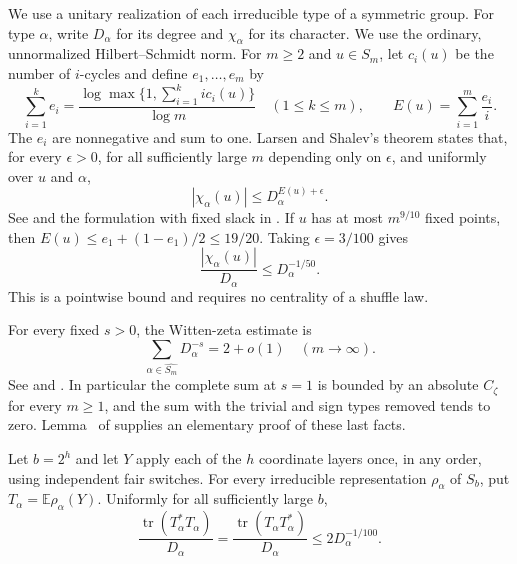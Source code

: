 We use a unitary realization of each irreducible type of a symmetric
group. For type $\alpha$, write $D_\alpha$ for its degree and
$\chi_\alpha$ for its character. We use the ordinary,
unnormalized Hilbert--Schmidt norm. For $m\ge2$ and $u\in S_m$, let
$c_i(u)$ be the number of $i$-cycles and define $e_1,\ldots,e_m$ by
\[
 \sum_{i=1}^k e_i=
 \frac{\log\max\{1,\sum_{i=1}^k i c_i(u)\}}{\log m}
 \quad(1\le k\le m),\qquad
 E(u)=\sum_{i=1}^m\frac{e_i}{i}.
\]
The $e_i$ are nonnegative and sum to one. Larsen and Shalev's theorem
states that, for every $\epsilon>0$, for all sufficiently large $m$
depending only on $\epsilon$, and uniformly over $u$ and $\alpha$,
\begin{equation}\label{frames:char:LS}
 |\chi_\alpha(u)|\le D_\alpha^{E(u)+\epsilon}.
\end{equation}
See \cite[Theorem~1.1]{larsen-shalev2008} and the formulation with
fixed slack in
\cite[Definition~2.1 and Theorem~2.2]{keller-lifshitz-sheinfeld2024}.
If $u$ has at most $m^{9/10}$ fixed points, then
$E(u)\le e_1+(1-e_1)/2\le19/20$. Taking $\epsilon=3/100$ gives
\begin{equation}\label{frames:char:few-fixed}
 \frac{|\chi_\alpha(u)|}{D_\alpha}\le D_\alpha^{-1/50}.
\end{equation}
This is a pointwise bound and requires no centrality of a shuffle law.

For every fixed $s>0$, the Witten-zeta estimate is
\begin{equation}\label{frames:char:zeta}
 \sum_{\alpha\in\widehat{S_m}}D_\alpha^{-s}=2+o(1)
 \quad(m\to\infty).
\end{equation}
See \cite[Theorems~1.1 and~2.6]{liebeck-shalev2004} and
\cite[Theorem~2.14]{keller-lifshitz-sheinfeld2024}.
In particular the complete sum at $s=1$ is bounded by an absolute
$C_\zeta$ for every $m\ge1$, and the sum with the trivial and sign types
removed tends to zero. Lemma~ of
\cite{partial-fourier} supplies an elementary proof of these last facts.

\begin{lemma}\label{frames:char:one-pass}
Let $b=2^h$ and let $Y$ apply each of the $h$ coordinate layers once,
in any order, using independent fair switches. For every irreducible
representation $\rho_\alpha$ of $S_b$, put $T_\alpha=\mathbb E\rho_\alpha(Y)$.
Uniformly for all sufficiently large $b$,
\[
 \frac{\operatorname{tr}(T_\alpha^*T_\alpha)}{D_\alpha}
 =\frac{\operatorname{tr}(T_\alpha T_\alpha^*)}{D_\alpha}
 \le2D_\alpha^{-1/100}.
\]
\end{lemma}

